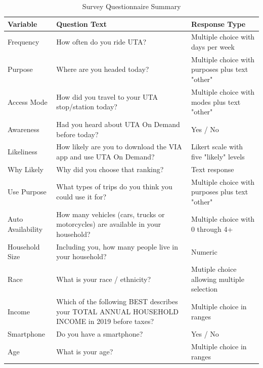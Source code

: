 \documentclass[smartcities,article,submit,moreauthors,pdftex]{Definitions/mdpi}
\begin{document}
\begin{table}[ht]
\renewcommand{\arraystretch}{1.5}
    \centering
    \caption{Survey Questionnaire Summary}
    \label{tab:survey-summary}
\begin{tabular}{l p{}p{}}
\toprule
Variable          & Question Text                                                                                    & Response Type                                     \\
\midrule
Frequency         & How often do you ride UTA?                                                                       & Multiple choice with days   per week              \\
Purpose           & Where are you headed today?                                                                      & Multiple choice with   purposes plus text "other" \\
Access Mode       & How did you travel to your   UTA stop/station today?                                             & Multiple choice with modes   plus text "other"    \\
Awareness         & Had you heard about UTA On   Demand before today?                                                & Yes / No                                          \\
Likeliness        & How likely are you to   download the VIA app and use UTA On Demand?                              & Likert scale with five   "likely" levels          \\
Why Likely        & Why did you choose that   ranking?                                                               & Text response                                     \\
Use Purpose       & What types of trips do you   think you could use it for?                                         & Multiple choice with   purposes plus text "other" \\
Auto Availability & How many vehicles (cars,   trucks or motorcycles) are available in your household?               & Multiple choice with 0   through 4+               \\
Household Size    & Including you, how many   people live in your household?                                         & Numeric                                           \\
Race              & What is your race /   ethnicity?                                                                 & Mutiple choice allowing   multiple selection      \\
Income            & Which of the following BEST   describes your TOTAL ANNUAL HOUSEHOLD INCOME in 2019 before taxes? & Multiple choice in ranges                         \\
Smartphone        & Do you have a smartphone?                                                                        & Yes / No                                          \\
Age               & What is your age?                                                                                & Multiple choice in ranges    \\
\bottomrule
\end{tabular}
\end{table}
\end{document}
